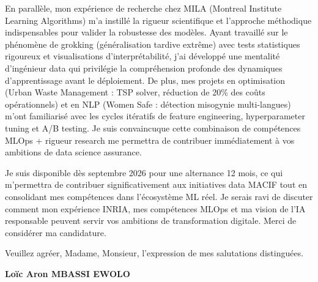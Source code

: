 \documentclass[a4paper,11pt]{article}
\begin{document}
\vspace{0.8em}
\noindent En parallèle, mon expérience de recherche chez MILA (Montreal Institute Learning Algorithms) m'a instillé la rigueur scientifique et l'approche méthodique indispensables pour valider la robustesse des modèles. Ayant travaillé sur le phénomène de grokking (généralisation tardive extrême) avec tests statistiques rigoureux et visualisations d'interprétabilité, j'ai développé une mentalité d'ingénieur data qui privilégie la compréhension profonde des dynamiques d'apprentissage avant le déploiement. De plus, mes projets en optimisation (Urban Waste Management : TSP solver, réduction de 20\% des coûts opérationnels) et en NLP (Women Safe : détection misogynie multi-langues) m'ont familiarisé avec les cycles itératifs de feature engineering, hyperparameter tuning et A/B testing. Je suis convaincuque cette combinaison de compétences MLOps + rigueur research me permettra de contribuer immédiatement à vos ambitions de data science assurance.

\vspace{0.8em}
\noindent Je suis disponible dès septembre 2026 pour une alternance 12 mois, ce qui m'permettra de contribuer significativement aux initiatives data MACIF tout en consolidant mes compétences dans l'écosystème ML réel. Je serais ravi de discuter comment mon expérience INRIA, mes compétences MLOps et ma vision de l'IA responsable peuvent servir vos ambitions de transformation digitale. Merci de considérer ma candidature.

\vspace{1.5em}
\noindent Veuillez agr\'eer, Madame, Monsieur, l'expression de mes salutations distingu\'ees.

\vspace{2em}
\noindent \textbf{Lo\"ic Aron MBASSI EWOLO}
\end{document}

